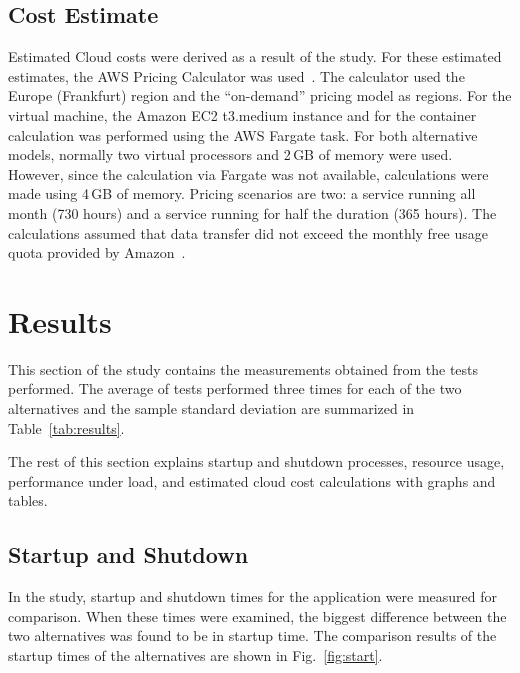 \documentclass[conference,a4paper]{IEEEtran}
\begin{document}
\subsection{Cost Estimate}
Estimated Cloud costs were derived as a result of the study. For these estimated estimates, the AWS Pricing Calculator was used~\cite{b9}. The calculator used the Europe (Frankfurt) region and the ``on-demand'' pricing model as regions. For the virtual machine, the Amazon EC2 t3.medium instance and for the container calculation was performed using the AWS Fargate task. For both alternative models, normally two virtual processors and 2\,GB of memory were used. However, since the calculation via Fargate was not available, calculations were made using 4\,GB of memory. Pricing scenarios are two: a service running all month (730 hours) and a service running for half the duration (365 hours). The calculations assumed that data transfer did not exceed the monthly free usage quota provided by Amazon~\cite{b10}.

\section{Results}
\label{sec:results}

This section of the study contains the measurements obtained from the tests performed. The average of tests performed three times for each of the two alternatives and the sample standard deviation are summarized in Table~\ref{tab:results}.



The rest of this section explains startup and shutdown processes, resource usage, performance under load, and estimated cloud cost calculations with graphs and tables.

\subsection{Startup and Shutdown}
In the study, startup and shutdown times for the application were measured for comparison. When these times were examined, the biggest difference between the two alternatives was found to be in startup time. The comparison results of the startup times of the alternatives are shown in Fig.~\ref{fig:start}.
\end{document}
